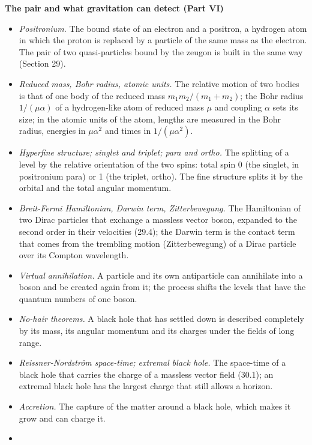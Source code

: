 \documentclass[
  10pt,
]{article}
\providecommand{\tightlist}{%
  \setlength{\itemsep}{0pt}\setlength{\parskip}{0pt}}
\begin{document}
\textbf{The pair and what gravitation can detect (Part VI)}

\begin{itemize}
\tightlist
\item
  \emph{Positronium.} The bound state of an electron and a positron, a
  hydrogen atom in which the proton is replaced by a particle of the
  same mass as the electron. The pair of two quasi-particles bound by
  the zeugon is built in the same way (Section 29).
\item
  \emph{Reduced mass, Bohr radius, atomic units.} The relative motion of
  two bodies is that of one body of the reduced mass
  \(m_1m_2/(m_1+m_2)\); the Bohr radius \(1/(\mu\alpha)\) of a
  hydrogen-like atom of reduced mass \(\mu\) and coupling \(\alpha\)
  sets its size; in the atomic units of the atom, lengths are measured
  in the Bohr radius, energies in \(\mu\alpha^2\) and times in
  \(1/(\mu\alpha^2)\).
\item
  \emph{Hyperfine structure; singlet and triplet; para and ortho.} The
  splitting of a level by the relative orientation of the two spins:
  total spin 0 (the singlet, in positronium para) or 1 (the triplet,
  ortho). The fine structure splits it by the orbital and the total
  angular momentum.
\item
  \emph{Breit-Fermi Hamiltonian, Darwin term, Zitterbewegung.} The
  Hamiltonian of two Dirac particles that exchange a massless vector
  boson, expanded to the second order in their velocities (29.4); the
  Darwin term is the contact term that comes from the trembling motion
  (Zitterbewegung) of a Dirac particle over its Compton wavelength.
\item
  \emph{Virtual annihilation.} A particle and its own antiparticle can
  annihilate into a boson and be created again from it; the process
  shifts the levels that have the quantum numbers of one boson.
\item
  \emph{No-hair theorems.} A black hole that has settled down is
  described completely by its mass, its angular momentum and its charges
  under the fields of long range.
\item
  \emph{Reissner-Nordström space-time; extremal black hole.} The
  space-time of a black hole that carries the charge of a massless
  vector field (30.1); an extremal black hole has the largest charge
  that still allows a horizon.
\item
  \emph{Accretion.} The capture of the matter around a black hole, which
  makes it grow and can charge it.
\item

\end{itemize}
\end{document}
